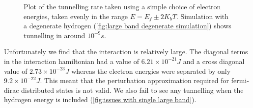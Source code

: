 \begin{figure}[htbp]
\begin{subfigure}{0.45\linewidth}
    \end{subfigure}
    \caption{Plot of the tunnelling rate taken using a
        simple choice of electron energies,
        taken evenly in the range \(E=E_f \pm 2 K_b T\).
        Simulation with a degenerate hydrogen
        (\cref{fig:large band degenerate simulation})
        shows tunnelling in around
        \(10^{-9}s\).
    }\label{fig:tunnelling rate single large band}
\end{figure}
Unfortunately we find that the interaction is
relatively large. The diagonal terms in
the interaction hamiltonian
had a value of \(6.21\times{}10^{-21}J\)
and a cross diagonal value of \(2.73\times{}10^{-23}J\)
whereas the electron energies were separated
by only \(9.2\times{}10^{-22}J\). This meant that
the perturbation approximation required for
fermi-dirac distributed states is not valid.
We also fail to see any tunnelling when
the hydrogen energy is included (\cref{fig:issues with single large band}).
